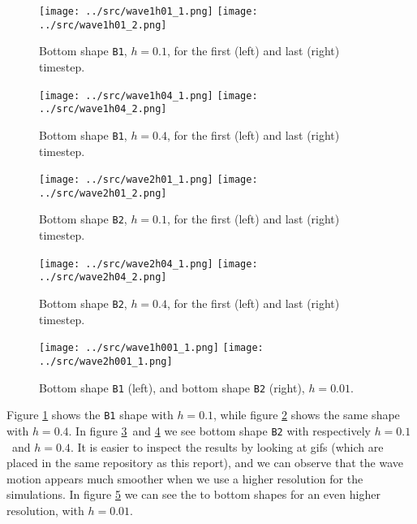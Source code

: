 \documentclass[10pt, a4paper]{amsart}
\numberwithin{figure}{section}
\numberwithin{table}{section}
\begin{document}
\begin{figure}
       \texttt{[image: ../src/wave1h01\_1.png]}
       \texttt{[image: ../src/wave1h01\_2.png]}
       \caption{Bottom shape \texttt{B1}, $h=0.1$, for the first (left) 
       and last (right) timestep.}
       \label{fig:wave1h01}
\end{figure}

\begin{figure}
       \texttt{[image: ../src/wave1h04\_1.png]}
       \texttt{[image: ../src/wave1h04\_2.png]}
       \caption{Bottom shape \texttt{B1}, $h=0.4$, for the first (left) 
       and last (right) timestep.}
       \label{fig:wave1h04}
\end{figure}

\begin{figure}
       \texttt{[image: ../src/wave2h01\_1.png]}
       \texttt{[image: ../src/wave2h01\_2.png]}
       \caption{Bottom shape \texttt{B2}, $h=0.1$, for the first (left) 
       and last (right) timestep.}
       \label{fig:wave2h01}
\end{figure}

\begin{figure}
       \texttt{[image: ../src/wave2h04\_1.png]}
       \texttt{[image: ../src/wave2h04\_2.png]}
       \caption{Bottom shape \texttt{B2}, $h=0.4$, for the first (left) 
       and last (right) timestep.}
       \label{fig:wave2h04}
\end{figure}
\begin{figure}
       \texttt{[image: ../src/wave1h001\_1.png]}
       \texttt{[image: ../src/wave2h001\_1.png]}
       \caption{Bottom shape \texttt{B1} (left), and bottom shape \texttt{B2}
       (right), $h=0.01$.}
       \label{fig:wave1h001}
\end{figure}

Figure \ref{fig:wave1h01} shows the \texttt{B1} shape with $h=0.1$, while
figure \ref{fig:wave1h04} shows the same shape with $h=0.4$. In figure
\ref{fig:wave2h01} and \ref{fig:wave2h04} we see bottom shape \texttt{B2} with
respectively $h=0.1$ and $h=0.4$. It is easier to inspect the results by
looking at gifs (which are placed in the same repository as this report), and
we can observe that the wave motion appears much smoother when we use a higher
resolution for the simulations. In figure \ref{fig:wave1h001} we can see the to
bottom shapes for an even higher resolution, with $h=0.01$.
\end{document}
